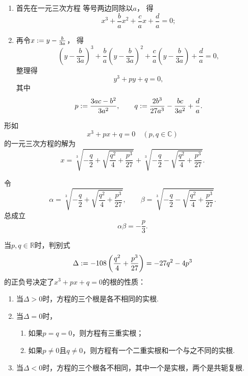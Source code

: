 \begin{algorithm}[将一元三次方程的一般形式化为标准形式]
\hfill
\begin{enumerate}
	\item 首先在一元三次方程  等号两边同除以\(a\)，
	得\begin{equation*}
		x^3 + \frac{b}{a} x^2 + \frac{c}{a} x + \frac{d}{a} = 0;
	\end{equation*}

	\item 再令\(x := y-\frac{b}{3a}\)，
	得\begin{equation*}
		\left(y-\frac{b}{3a}\right)^3
		+ \frac{b}{a} \left(y-\frac{b}{3a}\right)^2
		+ \frac{c}{a} \left(y-\frac{b}{3a}\right)
		+ \frac{d}{a}
		= 0,
	\end{equation*}
	整理得\begin{equation}
		y^3 + py + q = 0,
	\end{equation}
	其中\begin{equation*}
		p := \frac{3ac-b^2}{3a^2},
		\qquad
		q := \frac{2b^3}{27a^3}-\frac{bc}{3a^2}+\frac{d}{a}.
	\end{equation*}
\end{enumerate}
\end{algorithm}

\begin{theorem}[卡丹公式]
\def\a{-\frac{q}{2}}%
\def\d{\frac{q^2}{4}+\frac{p^3}{27}}
\def\b{\sqrt{\d}}%
\def\c#1{\sqrt[3]{\a#1\b}}%
形如\begin{equation*}
	x^3 + px + q = 0 \quad (p,q \in \mathbb{C})
\end{equation*}的一元三次方程的解为\begin{equation*}
	x = \c{+}+\c{-}.
\end{equation*}

令\begin{equation*}
	\alpha=\c{+}, \qquad \beta=\c{-}.
\end{equation*}
总成立\begin{equation*}
	\alpha \beta = -\frac{p}{3}.
\end{equation*}

当\(p,q\in\mathbb{R}\)时，判别式\begin{equation*}
	\Delta \defeq -108\left(\d\right) = -27q^2-4p^3
\end{equation*}的正负号决定了\(x^3+px+q=0\)的根的性质：\begin{enumerate}
	\item 当\(\Delta>0\)时，方程的三个根是各不相同的实根.
	\item 当\(\Delta=0\)时，\begin{enumerate}
		\item 如果\(p=q=0\)，则方程有三重实根；
		\item 如果\(p\neq0\)且\(q\neq0\)，则方程有一个二重实根和一个与之不同的实根.
		\end{enumerate}
	\item 当\(\Delta<0\)时，方程的三个根各不相同，其中一个是实根，两个是共轭复根.
\end{enumerate}
\end{theorem}

